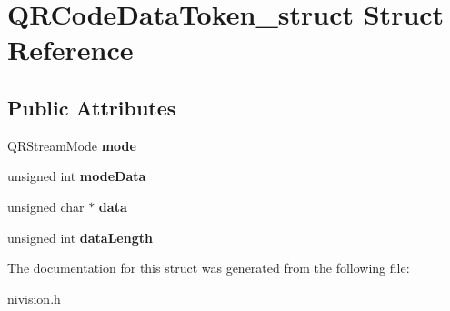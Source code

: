 \hypertarget{structQRCodeDataToken__struct}{\section{\-Q\-R\-Code\-Data\-Token\-\_\-struct \-Struct \-Reference}
\label{structQRCodeDataToken__struct}
}
\subsection*{\-Public \-Attributes}
\begin{DoxyCompactItemize}
\item 
\hypertarget{structQRCodeDataToken__struct_a0f9585b7dce912efb4c4e45bc1450d49}{\-Q\-R\-Stream\-Mode {\bfseries mode}}\label{structQRCodeDataToken__struct_a0f9585b7dce912efb4c4e45bc1450d49}

\item 
\hypertarget{structQRCodeDataToken__struct_a60be3d2613a906d29f1970a61315ada2}{unsigned int {\bfseries mode\-Data}}\label{structQRCodeDataToken__struct_a60be3d2613a906d29f1970a61315ada2}

\item 
\hypertarget{structQRCodeDataToken__struct_a492586d7e37d569d48c1bafa12409ac0}{unsigned char $\ast$ {\bfseries data}}\label{structQRCodeDataToken__struct_a492586d7e37d569d48c1bafa12409ac0}

\item 
\hypertarget{structQRCodeDataToken__struct_a3caa07d690d0be3be196a028d93f0b03}{unsigned int {\bfseries data\-Length}}\label{structQRCodeDataToken__struct_a3caa07d690d0be3be196a028d93f0b03}

\end{DoxyCompactItemize}


\-The documentation for this struct was generated from the following file\-:\begin{DoxyCompactItemize}
\item 
nivision.\-h\end{DoxyCompactItemize}
